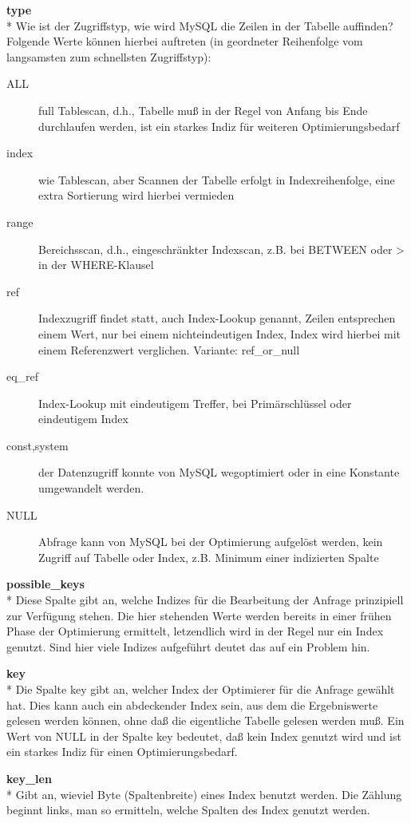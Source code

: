 \textbf{type}\\*
Wie ist der Zugriffstyp, wie wird MySQL die Zeilen in der Tabelle auffinden? Folgende Werte können hierbei auftreten (in geordneter Reihenfolge vom langsamsten zum schnellsten Zugriffstyp):
\begin{description}
\item[ALL] full Tablescan, d.h., Tabelle muß in der Regel von Anfang bis Ende durchlaufen werden, ist ein starkes Indiz für weiteren Optimierungsbedarf
\item[index] wie Tablescan, aber Scannen der Tabelle erfolgt in Indexreihenfolge, eine extra Sortierung wird hierbei vermieden
\item[range] Bereichsscan, d.h., eingeschränkter Indexscan, z.B. bei BETWEEN oder > in der WHERE-Klausel
\item[ref] Indexzugriff findet statt, auch Index-Lookup genannt, Zeilen entsprechen einem Wert, nur bei einem nichteindeutigen Index, Index wird hierbei mit einem Referenzwert verglichen. Variante: ref\_or\_null
\item[eq\_ref] Index-Lookup mit eindeutigem Treffer, bei Primärschlüssel oder eindeutigem Index
\item[const,system] der Datenzugriff konnte von MySQL wegoptimiert oder in eine Konstante umgewandelt werden.
\item[NULL] Abfrage kann von MySQL bei der Optimierung aufgelöst werden, kein Zugriff auf Tabelle oder Index, z.B. Minimum einer indizierten Spalte
\end{description}

\textbf{possible\_keys}\\*
Diese Spalte gibt an, welche Indizes für die Bearbeitung der Anfrage prinzipiell zur Verfügung stehen.
Die hier stehenden Werte werden bereits in einer frühen Phase der Optimierung ermittelt, letzendlich wird in der Regel nur ein Index genutzt. Sind hier viele Indizes aufgeführt deutet das auf ein Problem hin.

\textbf{key}\\*
Die Spalte key gibt an, welcher Index der Optimierer für die Anfrage gewählt hat. Dies kann auch ein abdeckender Index sein, aus dem die Ergebniswerte gelesen werden können, ohne daß die eigentliche Tabelle gelesen werden muß. Ein Wert von NULL in der Spalte key bedeutet, daß kein Index genutzt wird und ist ein starkes Indiz für einen Optimierungsbedarf.

\textbf{key\_len}\\*
Gibt an, wieviel Byte (Spaltenbreite) eines Index benutzt werden. Die Zählung beginnt links, man so ermitteln, welche Spalten des Index genutzt werden.

